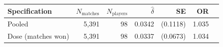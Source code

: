 \begin{tabular}{lrrrrrr}
\toprule
Specification & $N_{\text{matches}}$ & $N_{\text{players}}$ & $\hat{\delta}$ & SE & OR \\
\midrule
Pooled & 5,391 & 98 & 0.0342 & (0.1118) & 1.035 \\
Dose (matches won) & 5,391 & 98 & 0.0337 & (0.0673) & 1.034 \\
\bottomrule
\end{tabular}
